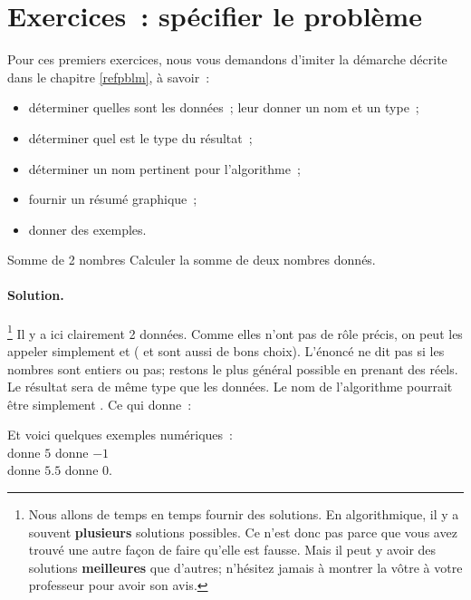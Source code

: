 \clearpage
\section{Exercices~: spécifier le problème}
\label{annexe-specifier}

Pour ces premiers exercices, nous vous demandons d’imiter la démarche décrite
dans le chapitre \ref{refpblm}, à savoir~:

\begin{itemize}
	\item déterminer quelles sont les données~;
		leur donner un nom et un type~;
	\item déterminer quel est le type du résultat~;
	\item déterminer un nom pertinent pour l’algorithme~;
	\item fournir un résumé graphique~;
	\item donner des exemples.
\end{itemize}

\begin{Exercice}{Somme de 2 nombres}
	Calculer la somme de deux nombres donnés.
	\paragraph{Solution.}%
	\footnote{%
		Nous allons de temps en temps 
		fournir des solutions.
		En algorithmique,
		il y a souvent \textbf{plusieurs} solutions possibles.
		Ce n’est donc pas parce que vous avez trouvé une autre façon de faire qu'elle est fausse.
		Mais il peut y avoir des solutions \textbf{meilleures}
		que d’autres; 
		n’hésitez jamais à montrer la vôtre
		à votre professeur pour avoir son avis.
	}
	Il y a ici clairement 2 données.
	Comme elles n’ont pas de rôle précis,
	on peut les appeler simplement 
	et 
	( et  sont aussi de bons choix).
	L’énoncé ne dit pas si les nombres sont entiers ou pas;
	restons le plus général possible en prenant des réels.
	Le résultat sera de même type que les données.
	Le nom de l’algorithme pourrait être simplement .
	Ce qui donne~:
	\begin{center}
	\end{center}			 
	Et voici quelques exemples numériques~:	\\
	 donne $5$      \quad
	 donne $-1$    \\
	 donne $5.5$  \quad
	 donne $0$.
\end{Exercice}

